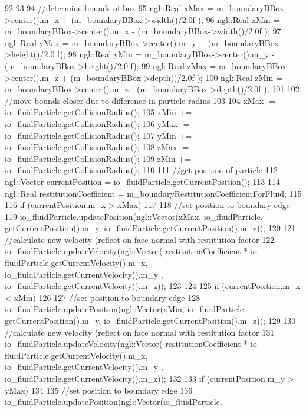 \begin{DoxyCode}
92 {
93 
94     //determine bounds of box
95     ngl::Real xMax = m_boundaryBBox->center().m_x + (m_boundaryBBox->width()/2.0f
      );
96     ngl::Real xMin = m_boundaryBBox->center().m_x - (m_boundaryBBox->width()/2.0f
      );
97     ngl::Real yMax = m_boundaryBBox->center().m_y + (m_boundaryBBox->height()/2.0
      f);
98     ngl::Real yMin = m_boundaryBBox->center().m_y - (m_boundaryBBox->height()/2.0
      f);
99     ngl::Real zMax = m_boundaryBBox->center().m_z + (m_boundaryBBox->depth()/2.0f
      );
100     ngl::Real zMin = m_boundaryBBox->center().m_z - (m_boundaryBBox->depth()/2.0f
      );
101 
102     //move bounds closer due to difference in particle radius
103 
104     xMax -= io_fluidParticle.getCollisionRadius();
105     xMin += io_fluidParticle.getCollisionRadius();
106     yMax -= io_fluidParticle.getCollisionRadius();
107     yMin += io_fluidParticle.getCollisionRadius();
108     zMax -= io_fluidParticle.getCollisionRadius();
109     zMin += io_fluidParticle.getCollisionRadius();
110 
111     //get position of particle
112     ngl::Vector currentPosition = io_fluidParticle.getCurrentPosition();
113 
114     ngl::Real restitutionCoefficient = m_boundaryRestitutionCoefficientForFluid;
115 
116     if (currentPosition.m_x > xMax)
117     {
118         //set position to boundary edge
119         io_fluidParticle.updatePosition(ngl::Vector(xMax, io_fluidParticle.
      getCurrentPosition().m_y, io_fluidParticle.getCurrentPosition().m_z));
120 
121         //calculate new velocity (reflect on face normal with restitution factor
122         io_fluidParticle.updateVelocity(ngl::Vector(-restitutionCoefficient * io_
      fluidParticle.getCurrentVelocity().m_x, io_fluidParticle.getCurrentVelocity().m_y
      , io_fluidParticle.getCurrentVelocity().m_z));
123 
124     }
125     if (currentPosition.m_x < xMin)
126     {
127         //set position to boundary edge
128         io_fluidParticle.updatePosition(ngl::Vector(xMin, io_fluidParticle.
      getCurrentPosition().m_y, io_fluidParticle.getCurrentPosition().m_z));
129 
130         //calculate new velocity (reflect on face normal with restitution factor
131         io_fluidParticle.updateVelocity(ngl::Vector(-restitutionCoefficient * io_
      fluidParticle.getCurrentVelocity().m_x, io_fluidParticle.getCurrentVelocity().m_y
      , io_fluidParticle.getCurrentVelocity().m_z));
132     }
133     if (currentPosition.m_y > yMax)
134     {
135         //set position to boundary edge
136         io_fluidParticle.updatePosition(ngl::Vector(io_fluidParticle.
}}
\end{DoxyCode}
